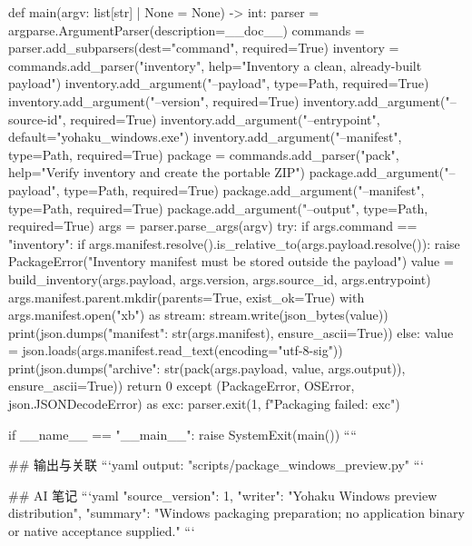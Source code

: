def main(argv: list[str] | None = None) -> int:
    parser = argparse.ArgumentParser(description=__doc__)
    commands = parser.add_subparsers(dest="command", required=True)
    inventory = commands.add_parser("inventory", help="Inventory a clean, already-built payload")
    inventory.add_argument("--payload", type=Path, required=True)
    inventory.add_argument("--version", required=True)
    inventory.add_argument("--source-id", required=True)
    inventory.add_argument("--entrypoint", default="yohaku_windows.exe")
    inventory.add_argument("--manifest", type=Path, required=True)
    package = commands.add_parser("pack", help="Verify inventory and create the portable ZIP")
    package.add_argument("--payload", type=Path, required=True)
    package.add_argument("--manifest", type=Path, required=True)
    package.add_argument("--output", type=Path, required=True)
    args = parser.parse_args(argv)
    try:
        if args.command == "inventory":
            if args.manifest.resolve().is_relative_to(args.payload.resolve()):
                raise PackageError("Inventory manifest must be stored outside the payload")
            value = build_inventory(args.payload, args.version, args.source_id, args.entrypoint)
            args.manifest.parent.mkdir(parents=True, exist_ok=True)
            with args.manifest.open("xb") as stream:
                stream.write(json_bytes(value))
            print(json.dumps({"manifest": str(args.manifest)}, ensure_ascii=True))
        else:
            value = json.loads(args.manifest.read_text(encoding="utf-8-sig"))
            print(json.dumps({"archive": str(pack(args.payload, value, args.output))}, ensure_ascii=True))
        return 0
    except (PackageError, OSError, json.JSONDecodeError) as exc:
        parser.exit(1, f"Packaging failed: {exc}\n")


if __name__ == "__main__":
    raise SystemExit(main())
````

## 输出与关联
```yaml
output: "scripts/package_windows_preview.py"
```

## AI 笔记
```yaml
{"source_version": 1, "writer": "Yohaku Windows preview distribution", "summary": "Windows packaging preparation; no application binary or native acceptance supplied."}
```
